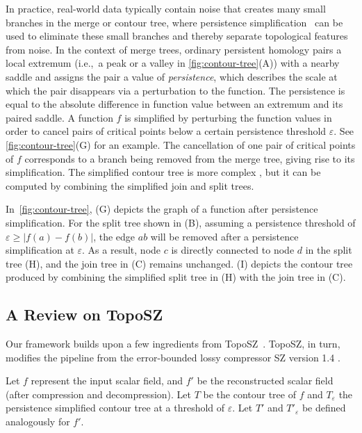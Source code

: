 In practice, real-world data typically contain noise that creates many small branches in the merge or contour tree, where persistence simplification~\cite{edelsbrunner2001hierarchical} can be used to eliminate these small branches and thereby separate topological features from noise. 
In the context of merge trees, ordinary persistent homology pairs a local extremum (i.e.,~a peak or a valley in \cref{fig:contour-tree}(A)) with a nearby saddle and assigns the pair a value of \emph{persistence}, which describes the scale at which the pair disappears via a perturbation to the function. The persistence is equal to the absolute difference in function value between an extremum and its paired saddle. A function $f$ is simplified by perturbing the function values in order to cancel pairs of critical points below a certain persistence threshold $\varepsilon$. See \cref{fig:contour-tree}(G) for an example. The cancellation of one pair of critical points of $f$ corresponds to a branch being removed from the merge tree, giving rise to its simplification.
The simplified contour tree is more complex \cite{hristov2021w}, but it can be computed by combining the simplified join and split trees. 

In~\cref{fig:contour-tree}, (G) depicts the graph of a function after persistence simplification. For the split tree shown in (B), assuming a persistence threshold of $\varepsilon \geq |f(a)-f(b)|$, the edge $ab$ will be removed after a persistence simplification at $\varepsilon$. As a result, node $c$ is directly connected to node $d$ in the split tree (H), and the join tree in (C) remains unchanged. (I) depicts the contour tree produced by combining the simplified split tree in (H) with the join tree in (C).

\subsection{A Review on TopoSZ}
\label{sec:TopoSZ}

Our framework builds upon a few ingredients from TopoSZ~\cite{yan2023toposz}. 
TopoSZ, in turn, modifies the pipeline from the error-bounded lossy compressor SZ version 1.4 \cite{tao2017significantly}. 

Let $f$ represent the input scalar field, and $f'$ be the reconstructed scalar field (after compression and decompression). 
Let $T$ be the contour tree of $f$ and $T_\varepsilon$ the persistence simplified contour tree at a threshold of $\varepsilon$. Let $T'$ and $T'_\varepsilon$ be defined analogously for $f'$.

